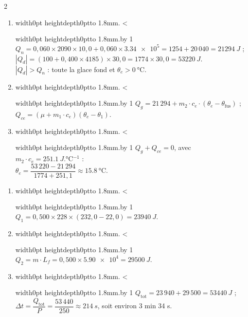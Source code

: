 \documentclass[11pt,a4paper]{article}
\newif\ifeleve
\newlength{\interligne}\setlength{\interligne}{7mm}
\newlength{\replen}
\newcommand{\pointilles}{{\color{cInk2!60}\leaders\hbox to 1.8mm{\hss.\hss}\hfill}\kern0pt}
\newcommand{\lignes}[1]{\leavevmode\vrule width0pt height\dimexpr\interligne-1mm\relax depth0pt\pointilles
  \lgn=1 \loop\ifnum\lgn<#1 \par\nointerlineskip\noindent\vrule width0pt height\interligne depth0pt\pointilles\advance\lgn by 1 \repeat}
\newcommand{\rep}[1]{%
  \ifeleve
    \sbox{\repbox}{\parbox{\linewidth}{#1}}%
    \replen=\dimexpr\ht\repbox+\dp\repbox\relax
    \repn=\numexpr\replen/\baselineskip+1\relax
    \ifnum\repn<2 \repn=2\fi
    \edef\nblignes{\the\repn}\lignes{\nblignes}%
  \else #1\fi}
\newcommand{\tfus}{\theta_{\mathrm{fus}}}
\newcommand{\dC}[1]{\qty{#1}{\degreeCelsius}}
\begin{document}
\begin{multicols}{2}
\begin{enumerate}[label={\sffamily\bfseries\arabic*.},leftmargin=5mm,itemsep=1pt]
  \item \rep{$Q_n = 0{,}060\times2090\times10{,}0 + 0{,}060\times\num{3,34e5} = 1254 + 20\,040 = \qty{21294}{J}$ ;\\ $|Q_d| = (100 + 0{,}400\times4185)\times30{,}0 = 1774\times30{,}0 = \qty{53220}{J}$.\\ $|Q_d| > Q_n$ : toute la glace fond et $\theta_e > \dC{0}$.}
  \item \rep{$Q_g = 21\,294 + m_2\cdot c_e\cdot(\theta_e - \tfus)$ ;\\ $Q_{ce} = (\mu + m_1\cdot c_e)(\theta_e - \theta_1)$.}
  \item \rep{$Q_g + Q_{ce} = 0$, avec $m_2\cdot c_e = \qty{251,1}{J.\degreeCelsius^{-1}}$ :\\ $\theta_e = \dfrac{53\,220 - 21\,294}{1774 + 251{,}1} \approx \dC{15,8}$.}
\end{enumerate}

\begin{enumerate}[label={\sffamily\bfseries\arabic*.},leftmargin=5mm,itemsep=1pt]
  \item \rep{$Q_1 = 0{,}500\times228\times(232{,}0 - 22{,}0) = \qty{23940}{J}$.}
  \item \rep{$Q_2 = m\cdot L_f = 0{,}500\times\num{5,90e4} = \qty{29500}{J}$.}
  \item \rep{$Q_{\mathrm{tot}} = 23\,940 + 29\,500 = \qty{53440}{J}$ ;\\ $\Delta t = \dfrac{Q_{\mathrm{tot}}}{P} = \dfrac{53\,440}{250} \approx \qty{214}{s}$, soit environ 3 min 34 s.}
\end{enumerate}
\end{multicols}
\end{document}
